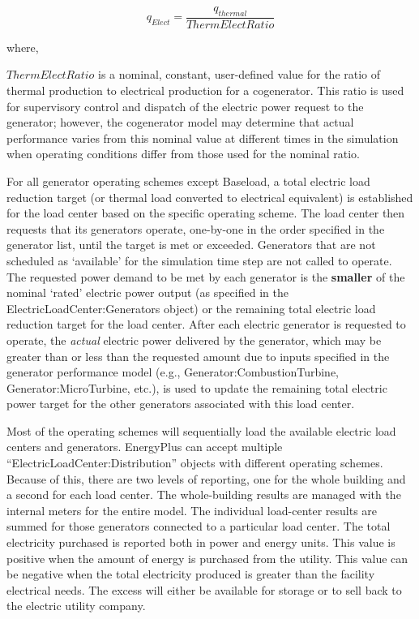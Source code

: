 \begin{equation}
{q_{Elect}} = \frac{{{q_{thermal}}}}{{ThermElectRatio}}
\end{equation}

where,

$ThermElectRatio$ is a nominal, constant, user-defined value for the ratio of thermal production to electrical production for a cogenerator. This ratio is used for supervisory control and dispatch of the electric power request to the generator; however, the cogenerator model may determine that actual performance varies from this nominal value at different times in the simulation when operating conditions differ from those used for the nominal ratio.

For all generator operating schemes except Baseload, a total electric load reduction target (or thermal load converted to electrical equivalent) is established for the load center based on the specific operating scheme. The load center then requests that its generators operate, one-by-one in the order specified in the generator list, until the target is met or exceeded. Generators that are not scheduled as ‘available’ for the simulation time step are not called to operate. The requested power demand to be met by each generator is the \textbf{smaller} of the nominal ‘rated’ electric power output (as specified in the ElectricLoadCenter:Generators object) or the remaining total electric load reduction target for the load center. After each electric generator is requested to operate, the \emph{actual} electric power delivered by the generator, which may be greater than or less than the requested amount due to inputs specified in the generator performance model (e.g., Generator:CombustionTurbine, Generator:MicroTurbine, etc.), is used to update the remaining total electric power target for the other generators associated with this load center.

Most of the operating schemes will sequentially load the available electric load centers and generators. EnergyPlus can accept multiple “ElectricLoadCenter:Distribution” objects with different operating schemes. Because of this, there are two levels of reporting, one for the whole building and a second for each load center. The whole-building results are managed with the internal meters for the entire model. The individual load-center results are summed for those generators connected to a particular load center. The total electricity purchased is reported both in power and energy units. This value is positive when the amount of energy is purchased from the utility. This value can be negative when the total electricity produced is greater than the facility electrical needs. The excess will either be available for storage or to sell back to the electric utility company.

